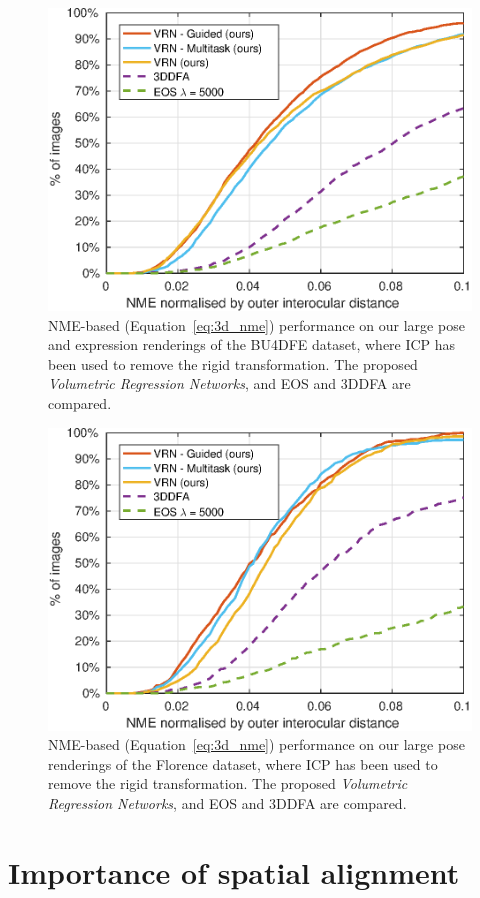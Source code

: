 \begin{figure}
  \centering
  \includegraphics[width=0.75\linewidth]{curves-icp/bu4dfe.eps}
  \caption[NME performance on BU4DFE with ICP Alignment]{NME-based
    (Equation~\ref{eq:3d_nme}) performance on our large pose and
    expression renderings of the BU4DFE dataset, where ICP has been
    used to remove the rigid transformation. The proposed
    \textit{Volumetric Regression Networks}, and EOS and 3DDFA are
    compared.}
  \label{roc:bu4dfeicp}
\end{figure}

\begin{figure}
  \centering
  \includegraphics[width=0.75\linewidth]{curves-icp/florence.eps}
  \caption[NME performance on Florence with ICP Alignment]{NME-based
    (Equation~\ref{eq:3d_nme}) performance on our large pose
    renderings of the Florence dataset, where ICP has been used to
    remove the rigid transformation. The proposed \textit{Volumetric
      Regression Networks}, and EOS and 3DDFA are compared.}
  \label{roc:florenceicp}
\end{figure}


\section{Importance of spatial alignment}
\label{sec:spatialimportance}


